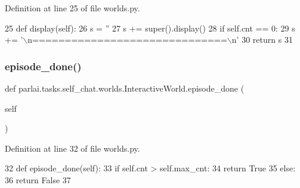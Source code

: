 Definition at line 25 of file worlds.\+py.


\begin{DoxyCode}
25     \textcolor{keyword}{def }display(self):
26         s = \textcolor{stringliteral}{''}
27         s += super().display()
28         \textcolor{keywordflow}{if} self.cnt == 0:
29             s += \textcolor{stringliteral}{'\(\backslash\)n==============================\(\backslash\)n'}
30         \textcolor{keywordflow}{return} s
31 
\end{DoxyCode}
\mbox{\label{classparlai_1_1tasks_1_1self__chat_1_1worlds_1_1InteractiveWorld_ac5340171ef38cc918534f6315d5f4b85}} 
\subsubsection{\texorpdfstring{episode\+\_\+done()}{episode\_done()}}
{\footnotesize\ttfamily def parlai.\+tasks.\+self\+\_\+chat.\+worlds.\+Interactive\+World.\+episode\+\_\+done (\begin{DoxyParamCaption}\item[{}]{self }\end{DoxyParamCaption})}



Definition at line 32 of file worlds.\+py.


\begin{DoxyCode}
32     \textcolor{keyword}{def }episode\_done(self):
33         \textcolor{keywordflow}{if} self.cnt > self.max\_cnt:
34             \textcolor{keywordflow}{return} \textcolor{keyword}{True}
35         \textcolor{keywordflow}{else}:
36             \textcolor{keywordflow}{return} \textcolor{keyword}{False}
37 
\end{DoxyCode}
\mbox{\label{classparlai_1_1tasks_1_1self__chat_1_1worlds_1_1InteractiveWorld_acc9ee34b52a3f17b4d7593c3eb39dd7e}} 
